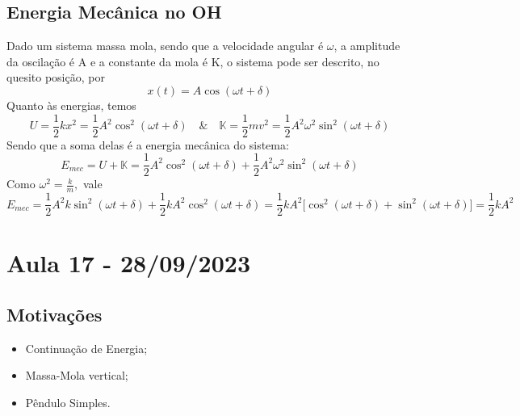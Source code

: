 \documentclass{article}
\begin{document}
\subsection{Energia Mecânica no OH}
Dado um sistema massa mola, sendo que a velocidade angular é \(\omega \), a amplitude da oscilação é A e a constante da mola é K, o sistema pode ser 
descrito, no quesito posição, por 
\[
  x(t) = A\cos{(\omega t + \delta )}
\]
Quanto às energias, temos 
\[
  U = \frac{1}{2}kx^{2} = \frac{1}{2}A^{2}\cos^{2}{(\omega t + \delta )}\quad\&\quad \mathbb{K} = \frac{1}{2}mv^{2} = \frac{1}{2}A^{2}\omega ^{2}\sin^{2}{(\omega t+\delta )}
\]
Sendo que a soma delas é a energia mecânica do sistema:
\[
  E_{mec} = U + \mathbb{K} = \frac{1}{2}A^{2}\cos^{2}{(\omega t + \delta )} + \frac{1}{2}A^{2}\omega ^{2}\sin^{2}{(\omega t+\delta )}
\]
Como \(\omega^{2} = \frac{k}{m},\) vale 
\[
  E_{mec} = \frac{1}{2}A^{2}k\sin^{2}{(\omega t + \delta )} + \frac{1}{2}kA^{2}\cos^{2}{(\omega t + \delta )} = \frac{1}{2}kA^{2}\biggl[\cos^{2}{(\omega t+\delta )} + \sin^{2}{(\omega t + \delta )}\biggr] = \frac{1}{2}kA^{2}
\]
\newpage 

\section{Aula 17 - 28/09/2023}
\subsection{Motivações}
\begin{itemize}
  \item Continuação de Energia;
  \item Massa-Mola vertical;
  \item Pêndulo Simples.
\end{itemize}
\end{document}
